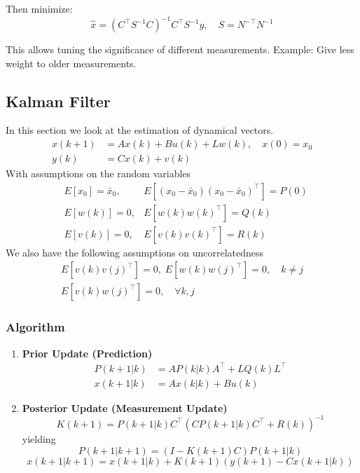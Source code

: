Then minimize:
\begin{equation*}
    \hat{x} = {(C^\top S^{-1} C)}^{-1} C^\top S^{-1} y, \quad S = N^{-\top} N^{-1}
\end{equation*}

This allows tuning the significance of different measurements. Example: Give less weight to older measurements.

\subsection{Kalman Filter}
In this section we look at the estimation of dynamical vectors.
\begin{align*}
    x(k + 1) & = Ax(k) + Bu(k) + Lw(k), \quad x(0) = x_0 \\
    y(k)     & = Cx(k) + v(k)
\end{align*}
With assumptions on the random variables
\begin{align*}
     & E[x_0] = \bar{x}_0, & E[(x_0 - \bar{x}_0){(x_0 - \bar{x}_0)}^\top] = P(0) \\
     & E[w(k)] = 0,        & E[w(k){w(k)}^\top] = Q(k)                           \\
     & E[v(k)] = 0,        & E[v(k){v(k)}^\top] = R(k)
\end{align*}
We also have the following assumptions on uncorrelatedness
\begin{gather*}
    E[v(k){v(j)}^\top] = 0,\;E[w(k){w(j)}^\top] = 0,\quad k\neq j \\
    E[v(k){w(j)}^\top] = 0,\quad \forall k, j
\end{gather*}

\subsubsection{Algorithm}

\begin{enumerate}
    \item \textbf{Prior Update (Prediction)}
          \begin{align*}
              P(k + 1|k) & = A P(k|k) A^\top + L Q(k) L^\top \\
              x(k + 1|k) & = A x(k|k) + Bu(k)
          \end{align*}
    \item \textbf{Posterior Update (Measurement Update)}
          \begin{equation*}
              K(k + 1) = P(k + 1|k) C^\top {\left(C P(k + 1|k) C^\top + R(k)\right)}^{-1}
          \end{equation*}
          yielding
          \begin{equation*}
              P(k + 1|k + 1) = (I - K(k + 1) C) P(k + 1|k)
          \end{equation*}
          {\small
          \begin{equation*}
              x(k + 1|k + 1) = x(k + 1|k) + K(k + 1) \left(y(k + 1) - C x(k + 1|k)\right)
          \end{equation*}
          }
\end{enumerate}

